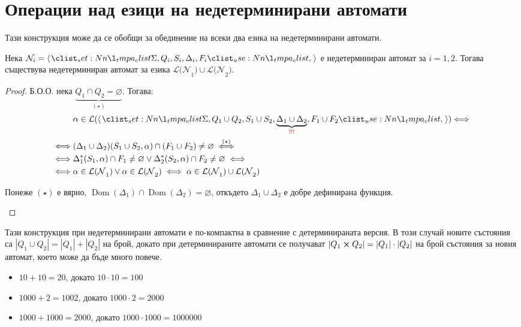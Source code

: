 \section{Операции над езици на недетерминирани автомати}

Тази конструкция може да се обобщи за обединение на всеки два езика на недетерминирани автомати.

\begin{claim}
    Нека $\mathcal{N}_i = \opair{\Sigma, Q_i, S_i, \Delta_i, F_i}$  е недетерминиран автомат за $i = 1, 2$.
    Тогава съществува недетерминиран автомат за езика $\mathcal{L(N}_1) \cup \mathcal{L(N}_2)$.
\end{claim}

\begin{proof}
    Б.О.О. нека $\underbrace{Q_1 \cap Q_2 = \varnothing}_{(\star)}$. Тогава:
    \begin{align*}
             & \alpha \in \mathcal{L}(\opair{\Sigma, Q_1 \cup Q_2, S_1 \cup S_2, \underbrace{\Delta_1 \cup \Delta_2}_{\textcolor{red}{!!!}}, F_1 \cup F_2}) {\iff} \\
        \iff & (\Delta_1 \cup \Delta_2)(S_1 \cup S_2, \alpha) \cap (F_1 \cup F_2) \neq \varnothing \stackrel{(\star)}{\iff}                                        \\
        \iff & \Delta_1^*(S_1, \alpha) \cap F_1 \neq \varnothing \lor \Delta_2^*(S_2, \alpha) \cap F_2 \neq \varnothing \iff                                       \\
        \iff & \alpha \in \mathcal{L(N}_1) \lor \alpha \in \mathcal{L(N}_2) \iff \alpha \in \mathcal{L(N}_1) \cup \mathcal{L(N}_2)
    \end{align*}
    \begin{remark}[\textcolor{red}{!!!}]
        Понеже $(\star)$ е вярно, $\operatorname{Dom}(\Delta_1) \cap \operatorname{Dom}(\Delta_2) = \varnothing$, откъдето $\Delta_1 \cup \Delta_2$ е добре дефинирана функция.
    \end{remark}
\end{proof}

Тази конструкция при недетерминирани автомати е по-компактна в сравнение с детерминираната версия.
В този случай новите състояния са $|Q_1 \cup Q_2| = |Q_1| + |Q_2|$ на брой,
докато при детерминираните автомати се получават $|Q_1 \crossproduct Q_2| = |Q_1| \cdot |Q_2|$ на брой състояния за новия автомат, което може да бъде много повече.

\begin{itemize}
    \item $10 + 10 = 20$, докато $10 \cdot 10 = 100$
    \item $1000 + 2 = 1002$, докато $1000 \cdot 2 = 2000$
    \item $1000 + 1000 = 2000$, докато $1000 \cdot 1000 = 1000000$
\end{itemize}

